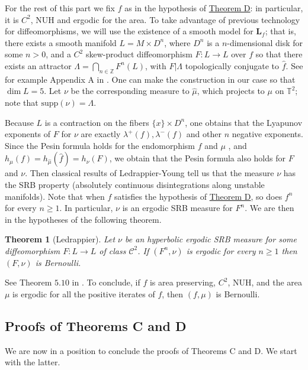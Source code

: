 \documentclass[11pt,letterpaper,reqno]{article}
\newtheorem{theorem}{Theorem}[section]
\newcommand{\TT}{\mathbb{T}^2}
\newcommand{\hTTf}[1][f]{\mathbf{L}_{#1}}
\newcommand{\hmu}{\hat{\mu}}
\begin{document}
For the rest of this part we fix $f$ as in the hypothesis of \hyperlink{theoremD}{Theorem D}: in particular, it is $C^2$, NUH and ergodic for the area. To take advantage of previous technology for diffeomorphisms, we will use the existence of a smooth model for $\hTTf$; that is, there exists a smooth manifold $L=M\times D^n$, where $D^n$ is a $n$-dimensional disk for some $n>0$, and a $C^2$ skew-product diffeomorphism $F:L\to L$ over $f$ so that there exists an attractor $\Lambda=\bigcap_{n\in\mathbb Z} F^n(L)$, with $F|\Lambda$ topologically conjugate to $\hat f$. See for example Appendix A in \cite{expcontendoVianaYang}. One can make the construction in our case so that $\dim L=5$. Let $\nu$ be the corresponding measure to $\hmu$, which projects to $\mu$ on $\TT$; note that $\mathrm{supp }(\nu) = \Lambda$.

Because $L$ is a contraction on the fibers $\{x\}\times D^n$, one obtains that the Lyapunov exponents of $F$ for $\nu$ are exactly $\lambda^+(f),\lambda^-(f)$ and other $n$ negative exponents. Since the Pesin formula holds for the endomorphism $f$ and $\mu$ \cite{pesinendo}, and $h_{\mu}(f)=h_{\hat\mu}(\hat f)=h_{\nu}(F)$, we obtain that the Pesin formula also holds for $F$ and $\nu$. Then classical results of Ledrappier-Young \cite{LedYoungI} tell us that the measure $\nu$ has the SRB property (absolutely continuous disintegrations along unstable manifolds). Note that when $f$ satisfies the hypothesis of \hyperlink{theoremD}{Theorem D}, so does $f^n$ for every $n \geq 1$. In particular, $\nu$ is an ergodic SRB measure for $F^n$. We are then in the hypotheses of the following theorem.

\begin{theorem}[Ledrappier] \label{thm:ledrappier}
 Let $\nu$ be an hyperbolic ergodic SRB measure for some diffeomorphism $F:L\to L$ of class $\mathcal C^2$. If $(F^n,\nu)$ is ergodic for every $n\geq 1$ then $(F,\nu)$ is Bernoulli.
 \end{theorem} 

See Theorem $5.10$ in \cite{LedrappierErg}. To conclude, if $f$ is area preserving, $C^2$, NUH, and the area $\mu$ is ergodic for all the positive iterates of $f$, then $(f,\mu)$ is Bernoulli.  

\subsection{Proofs of Theorems C and D}

We are now in a position to conclude the proofs of Theorems C and D. We start with the latter.
\end{document}
